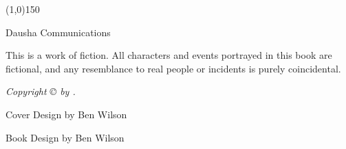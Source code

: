 \frontmatter
  \begin{titlingpage}
  \pagestyle{empty}
  \begin{center}
  \vspace*{\fill}

  \HUGE\textbf{\textsf\thetitle}

  \vspace*{0.25in}
  \line(1,0){150}
  \vspace*{0.25in}

  \Large\textsf\theauthor

  \vspace*{\fill}

  \vspace*{\fill}
  \hspace*{\fill}\textsf{Dausha}\hspace*{\fill}\newline%
  \textsf{Communications}
  \end{center}
  \end{titlingpage}

  \vspace*{\fill}
  \pagestyle{empty}

  \par\noindent\emph{\thetitle}
  \newline
  
  \par\noindent This is a work of fiction. All characters and events portrayed in this
  book are fictional, and any resemblance to real people or incidents is
  purely coincidental.\newline

  \par\noindent\emph{Copyright \copyright{} \yearonly{} by \theauthor.}\newline
  
  \par\noindent Cover Design by Ben Wilson\newline

  \par\noindent Book Design by Ben Wilson\newline

